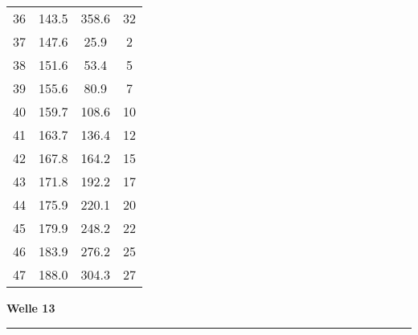 \documentclass[10pt, a4paper]{article}
\begin{document}
\begin{center}
\begin{tabular}{c|c|c|c}
		36 & 143.5 & 358.6 & 32 \\
		37 & 147.6 & 25.9 & 2 \\
		38 & 151.6 & 53.4 & 5 \\
		39 & 155.6 & 80.9 & 7 \\
		40 & 159.7 & 108.6 & 10 \\
		41 & 163.7 & 136.4 & 12 \\
		42 & 167.8 & 164.2 & 15 \\
		43 & 171.8 & 192.2 & 17 \\
		44 & 175.9 & 220.1 & 20 \\
		45 & 179.9 & 248.2 & 22 \\
		46 & 183.9 & 276.2 & 25 \\
		47 & 188.0 & 304.3 & 27 \\
	\end{tabular}
\end{center}
\newpage
\centerline{{\bf Welle 13} }
\rule{1.0\textwidth}{0.5mm}
\end{document}
